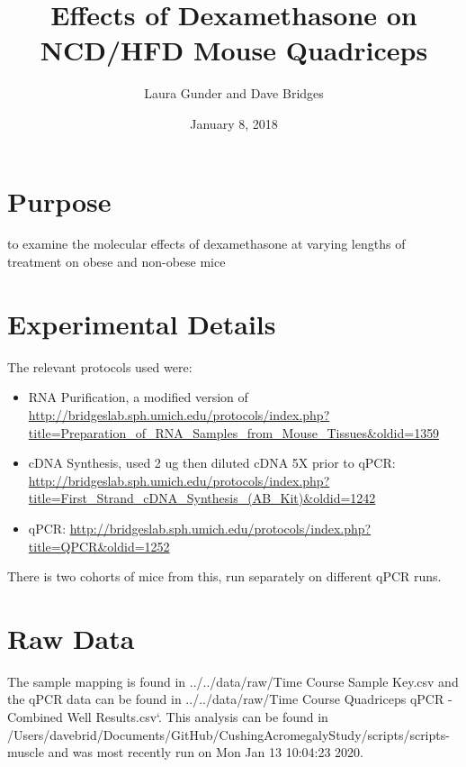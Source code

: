 \documentclass[]{article}
\title{Effects of Dexamethasone on NCD/HFD Mouse Quadriceps}
\author{Laura Gunder and Dave Bridges}
\date{January 8, 2018}
\providecommand{\tightlist}{%
  \setlength{\itemsep}{0pt}\setlength{\parskip}{0pt}}
\begin{document}
\maketitle

{
\setcounter{tocdepth}{2}
\tableofcontents
}
\section{Purpose}\label{purpose}

to examine the molecular effects of dexamethasone at varying lengths of
treatment on obese and non-obese mice

\section{Experimental Details}\label{experimental-details}

The relevant protocols used were:

\begin{itemize}
\tightlist
\item
  RNA Purification, a modified version of
  \url{http://bridgeslab.sph.umich.edu/protocols/index.php?title=Preparation_of_RNA_Samples_from_Mouse_Tissues\&oldid=1359}
\item
  cDNA Synthesis, used 2 ug then diluted cDNA 5X prior to qPCR:
  \url{http://bridgeslab.sph.umich.edu/protocols/index.php?title=First_Strand_cDNA_Synthesis_(AB_Kit)\&oldid=1242}
\item
  qPCR:
  \url{http://bridgeslab.sph.umich.edu/protocols/index.php?title=QPCR\&oldid=1252}
\end{itemize}

There is two cohorts of mice from this, run separately on different qPCR
runs.

\section{Raw Data}\label{raw-data}

The sample mapping is found in ../../data/raw/Time Course Sample Key.csv
and the qPCR data can be found in ../../data/raw/Time Course Quadriceps
qPCR - Combined Well Results.csv`. This analysis can be found in
/Users/davebrid/Documents/GitHub/CushingAcromegalyStudy/scripts/scripts-muscle
and was most recently run on Mon Jan 13 10:04:23 2020.
\end{document}
